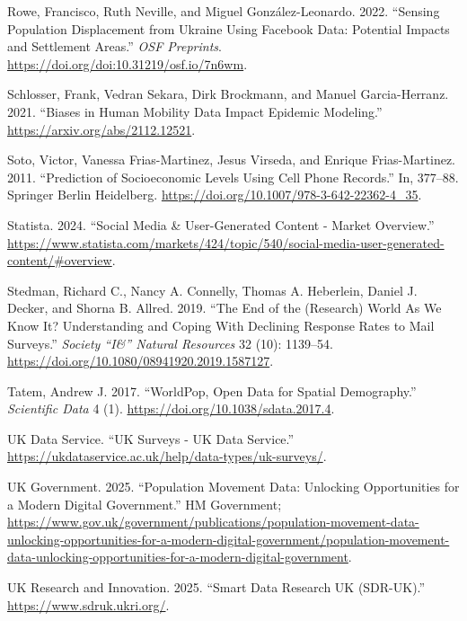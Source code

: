 \documentclass{article}
\newlength{\cslhangindent}
\newenvironment{CSLReferences}[2] %
 {\begin{list}{}{%
  \setlength{\itemindent}{0pt}
  \setlength{\leftmargin}{0pt}
  \setlength{\parsep}{0pt}
  \ifodd #1
   \setlength{\leftmargin}{\cslhangindent}
   \setlength{\itemindent}{-1\cslhangindent}
  \fi
  \setlength{\itemsep}{#2\baselineskip}}}
 {\end{list}}
\begin{document}
\begin{CSLReferences}{1}{0}
Rowe, Francisco, Ruth Neville, and Miguel González-Leonardo. 2022. {``Sensing Population Displacement from Ukraine Using Facebook Data: Potential Impacts and Settlement Areas.''} \emph{OSF Preprints}. \url{https://doi.org/doi:10.31219/osf.io/7n6wm}.

Schlosser, Frank, Vedran Sekara, Dirk Brockmann, and Manuel Garcia-Herranz. 2021. {``Biases in Human Mobility Data Impact Epidemic Modeling.''} \url{https://arxiv.org/abs/2112.12521}.

Soto, Victor, Vanessa Frias-Martinez, Jesus Virseda, and Enrique Frias-Martinez. 2011. {``Prediction of Socioeconomic Levels Using Cell Phone Records.''} In, 377--88. Springer Berlin Heidelberg. \url{https://doi.org/10.1007/978-3-642-22362-4_35}.

Statista. 2024. {``Social Media \& User-Generated Content - Market Overview.''} \url{https://www.statista.com/markets/424/topic/540/social-media-user-generated-content/\#overview}.

Stedman, Richard C., Nancy A. Connelly, Thomas A. Heberlein, Daniel J. Decker, and Shorna B. Allred. 2019. {``The End of the (Research) World As We Know It? Understanding and Coping With Declining Response Rates to Mail Surveys.''} \emph{Society {``I\&''} Natural Resources} 32 (10): 1139--54. \url{https://doi.org/10.1080/08941920.2019.1587127}.

Tatem, Andrew J. 2017. {``WorldPop, Open Data for Spatial Demography.''} \emph{Scientific Data} 4 (1). \url{https://doi.org/10.1038/sdata.2017.4}.

UK Data Service. {``{U}{K} Surveys - {U}{K} {D}ata {S}ervice.''} \url{https://ukdataservice.ac.uk/help/data-types/uk-surveys/}.

UK Government. 2025. {``Population Movement Data: Unlocking Opportunities for a Modern Digital Government.''} HM Government; \url{https://www.gov.uk/government/publications/population-movement-data-unlocking-opportunities-for-a-modern-digital-government/population-movement-data-unlocking-opportunities-for-a-modern-digital-government}.

UK Research and Innovation. 2025. {``Smart Data Research UK (SDR-UK).''} \url{https://www.sdruk.ukri.org/}.


\end{CSLReferences}
\end{document}
